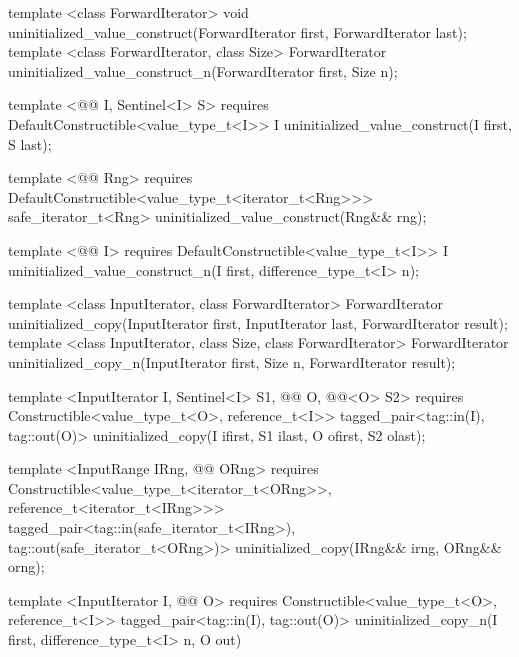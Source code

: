 {\color{remclr}
\begin{codeblock}
template <class ForwardIterator>
  void uninitialized_value_construct(ForwardIterator first, ForwardIterator last);
template <class ForwardIterator, class Size>
  ForwardIterator uninitialized_value_construct_n(ForwardIterator first, Size n);
\end{codeblock}
} %
{\color{addclr}
\begin{codeblock}
template <@@ I, Sentinel<I> S>
  requires
DefaultConstructible<value_type_t<I>>
  I uninitialized_value_construct(I first, S last);

template <@@ Rng>
  requires
DefaultConstructible<value_type_t<iterator_t<Rng>>>
  safe_iterator_t<Rng> uninitialized_value_construct(Rng&& rng);

template <@@ I>
  requires
DefaultConstructible<value_type_t<I>>
  I uninitialized_value_construct_n(I first, difference_type_t<I> n);
\end{codeblock}
} %

{\color{remclr}
\begin{codeblock}
template <class InputIterator, class ForwardIterator>
  ForwardIterator uninitialized_copy(InputIterator first, InputIterator last,
                                     ForwardIterator result);
template <class InputIterator, class Size, class ForwardIterator>
  ForwardIterator uninitialized_copy_n(InputIterator first, Size n,
                                       ForwardIterator result);
\end{codeblock}
} %
{\color{addclr}
\begin{codeblock}
template <InputIterator I, Sentinel<I> S1, @@ O, @@<O> S2>
  requires
Constructible<value_type_t<O>, reference_t<I>>
  tagged_pair<tag::in(I), tag::out(O)>
uninitialized_copy(I ifirst, S1 ilast, O ofirst, S2 olast);

template <InputRange IRng, @@ ORng>
  requires
Constructible<value_type_t<iterator_t<ORng>>, reference_t<iterator_t<IRng>>>
  tagged_pair<tag::in(safe_iterator_t<IRng>), tag::out(safe_iterator_t<ORng>)>
uninitialized_copy(IRng&& irng, ORng&& orng);

template <InputIterator I, @@ O>
  requires
Constructible<value_type_t<O>, reference_t<I>>
  tagged_pair<tag::in(I), tag::out(O)>
uninitialized_copy_n(I first, difference_type_t<I> n, O out)
\end{codeblock}
} %

